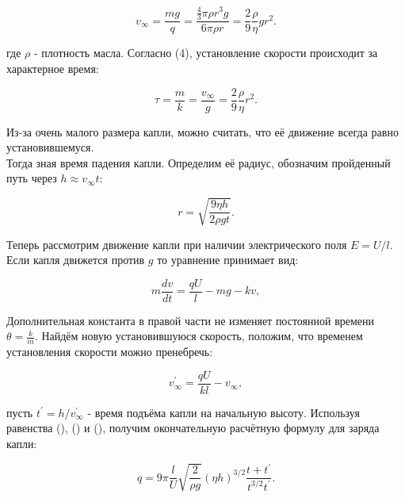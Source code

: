 \documentclass{lab}
\begin{document}
\begin{equation}
    v_{\infty} = \frac{mg}{q}=\frac{\frac{4}{3} \pi \rho r^{3} g}{6 \pi \rho r}=\frac{2}{9}\frac{\rho}{\eta}g r^{2}.
    \label{eq:speed_inf_calculated}
\end{equation}

где $\rho$ - плотность масла. Согласно (4), установление скорости происходит за характерное время:

\begin{equation}
    \tau = \frac{m}{k}=\frac{v_{\infty}}{g} = \frac{2}{9}\frac{\rho}{\eta} r^{2}.
    \label{eq:tau}
\end{equation}

Из-за очень малого размера капли, можно считать, что её движение всегда равно \\ установившемуся.
\\
Тогда зная время падения капли. Определим её радиус, обозначим пройденный путь через $h \approx v_{\infty}t$:

\begin{equation}
    r = \sqrt{\frac{9 \eta h}{2 \rho gt} }.
    \label{eq:radius}
\end{equation}

Теперь рассмотрим движение капли при наличии электрического поля $E=U/l$. Если капля движется против $g$ то уравнение принимает вид:

\begin{equation}
    m\frac{dv}{dt} = \frac{qU}{l} - mg - kv,
\end{equation}

Дополнительная константа в правой части не изменяет постоянной времени $\theta = \frac{k}{m}$. Найдём новую установившуюся скорость, положим, что временем установления скорости можно пренебречь:

\begin{equation}
    v_{\infty}^{'} = \frac{qU}{kl} - v_{\infty},
    \label{eq:v_inf_real}
\end{equation}

пусть $t^{'} = h/v^{'}_{\infty}$ - время подъёма капли на начальную высоту. Используя равенства (), () и (), получим окончательную расчётную формулу для заряда капли:

\begin{equation}
    q = 9\pi \frac{l}{U} \sqrt{\frac{2}{\rho g}} (\eta h)^{3/2} \frac{t + t^{'}}{t^{3/2} t^{'}}.
    \label{eq:q_final}
\end{equation}
\end{document}
